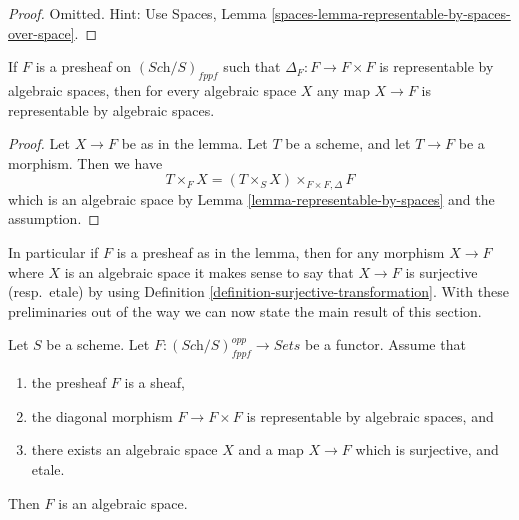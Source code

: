 \begin{proof}
Omitted. Hint: Use
Spaces, Lemma \ref{spaces-lemma-representable-by-spaces-over-space}.
\end{proof}

\begin{lemma}
\label{lemma-representable-diagonal}
If $F$ is a presheaf on $(\textit{Sch}/S)_{fppf}$ such that
$\Delta_F : F \to F \times F$ is representable by algebraic spaces,
then for every algebraic space $X$ any map $X \to F$ is representable
by algebraic spaces.
\end{lemma}

\begin{proof}
Let $X \to F$ be as in the lemma. Let $T$ be a scheme, and let $T \to F$ be
a morphism. Then we have
$$
T \times_F X = (T \times_S X) \times_{F \times F, \Delta} F
$$
which is an algebraic space by
Lemma \ref{lemma-representable-by-spaces}
and the assumption.
\end{proof}

\noindent
In particular if $F$ is a presheaf as in the lemma, then for any
morphism $X \to F$ where $X$ is an algebraic space it makes sense to
say that $X \to F$ is surjective (resp.\ etale) by using
Definition \ref{definition-surjective-transformation}.
With these preliminaries out of the way we can now state the main
result of this section.

\begin{theorem}
\label{theorem-bootstrap}
Let $S$ be a scheme.
Let $F : (\textit{Sch}/S)_{fppf}^{opp} \to \textit{Sets}$ be a functor.
Assume that
\begin{enumerate}
\item the presheaf $F$ is a sheaf,
\item the diagonal morphism $F  \to F \times F$ is representable by
algebraic spaces, and
\item there exists an algebraic space $X$
and a map $X \to F$ which is surjective, and etale.
\end{enumerate}
Then $F$ is an algebraic space.
\end{theorem}

